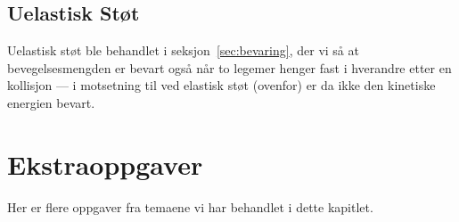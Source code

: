 
\newpage

\subsection{Uelastisk Støt}

Uelastisk støt ble behandlet i seksjon~\ref{sec:bevaring}, der vi så at bevegelsesmengden er bevart også når to legemer henger fast i hverandre etter en kollisjon — i motsetning til ved elastisk støt (ovenfor) er da ikke den kinetiske energien bevart.


\clearpage
\section{Ekstraoppgaver}

Her er flere oppgaver fra temaene vi har behandlet i dette kapitlet.





